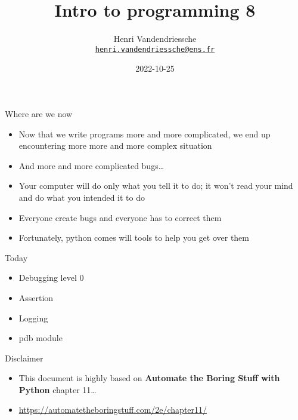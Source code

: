 \documentclass[
  8pt,
  ignorenonframetext,
]{beamer}
\title{Intro to programming 8}
\author{Henri Vandendriessche\\
\href{mailto:henri.vandendriessche@ens.fr}{\nolinkurl{henri.vandendriessche@ens.fr}}}
\date{2022-10-25}
\providecommand{\tightlist}{%
  \setlength{\itemsep}{0pt}\setlength{\parskip}{0pt}}
\begin{document}
\frame{\titlepage}

\begin{frame}{Where are we now}
\protect\hypertarget{where-are-we-now}{}
\begin{itemize}[<+->]
\tightlist
\item
  Now that we write programs more and more complicated, we end up
  encountering more more and more complex situation
\end{itemize}

\begin{itemize}[<+->]
\tightlist
\item
  And more and more complicated bugs\ldots{}
\end{itemize}

\begin{itemize}[<+->]
\tightlist
\item
  Your computer will do only what you tell it to do; it won't read your
  mind and do what you intended it to do
\end{itemize}

\begin{itemize}[<+->]
\tightlist
\item
  Everyone create bugs and everyone has to correct them
\end{itemize}

\begin{itemize}[<+->]
\tightlist
\item
  Fortunately, python comes will tools to help you get over them
\end{itemize}
\end{frame}

\begin{frame}{Today}
\protect\hypertarget{today}{}
\begin{itemize}
\item
  Debugging level 0
\item
  Assertion
\item
  Logging
\item
  pdb module
\end{itemize}
\end{frame}

\begin{frame}{Disclaimer}
\protect\hypertarget{disclaimer}{}
\begin{itemize}
\item
  This document is highly based on \textbf{Automate the Boring Stuff
  with Python} chapter 11\ldots{}
\item
  \url{https://automatetheboringstuff.com/2e/chapter11/}
\end{itemize}
\end{frame}
\end{document}
